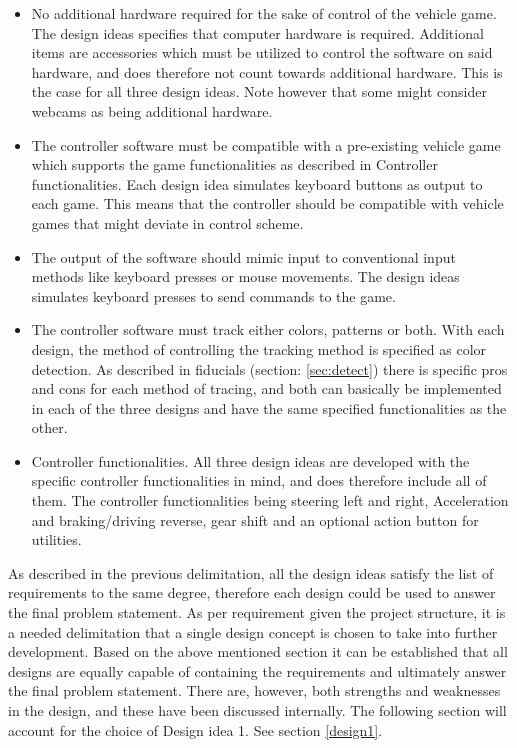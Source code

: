 \begin{itemize}
\item No additional hardware required for the sake of control of the vehicle game.\newline
The design ideas specifies that computer hardware is required. Additional items are accessories which must be utilized to control the software on said hardware, and does therefore not count towards additional hardware. This is the case for all three design ideas. Note however that some might consider webcams as being additional hardware.

\item The controller software must be compatible with a pre-existing vehicle game which supports
the game functionalities as described in Controller functionalities.\newline
Each design idea simulates keyboard buttons as output to each game. This means that the controller should be compatible with vehicle games that might deviate in control scheme.

\item The output of the software should mimic input to conventional input methods like keyboard
presses or mouse movements.\newline
The design ideas simulates keyboard presses to send commands to the game. 

\item The controller software must track either colors, patterns or both.\newline
With each design, the method of controlling the tracking method is specified as color detection. As described in fiducials (section: \ref{sec:detect}) there is specific pros and cons for each method of tracing, and both can basically be implemented in each of the three designs and have the same specified functionalities as the other.

\item Controller functionalities.\newline
All three design ideas are developed with the specific controller functionalities in mind, and does therefore include all of them. The controller functionalities being steering left and right, Acceleration and braking/driving reverse, gear shift and an optional action button for utilities.

\end{itemize}

As described in the previous delimitation, all the design ideas satisfy the list of requirements to the same degree, therefore each design could be used to answer the final problem statement.
As per requirement given the project structure, it is a needed delimitation that a single design concept is chosen to take into further development. Based on the above mentioned section it can be established that all designs are equally capable of containing the requirements and ultimately answer the final problem statement. There are, however, both strengths and weaknesses in the design, and these have been discussed internally. The following section will account for the choice of Design idea 1. See section \ref{design1}.	


